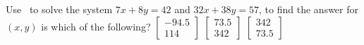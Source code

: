 \begin{activity}
Use \script\ to solve the system \(7x+8y=42\) and \(32x+38y=57\), to find the answer for \((x,y)\) is which of the following?
{\(\begin{bmatrix} -94.5\\114 \end{bmatrix}\)}
{\(\begin{bmatrix} 73.5\\342 \end{bmatrix}\)}
{\(\begin{bmatrix} 342\\73.5 \end{bmatrix}\)}
\end{activity}





